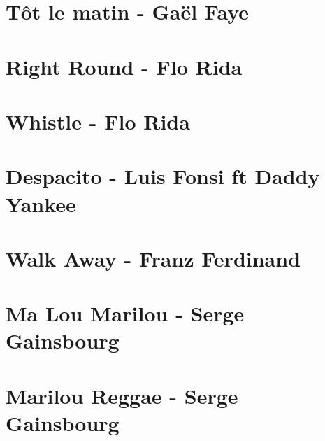 \documentclass{guitartabs}
\begin{document}
\section{Tôt le matin - Gaël Faye}
\begin{guitar}

\end{guitar}

\section{Right Round - Flo Rida}
\begin{guitar}

\end{guitar}


\section{Whistle - Flo Rida}
\begin{guitar}

\end{guitar}

\section{Despacito - Luis Fonsi ft Daddy Yankee}
\begin{guitar}

\end{guitar}



\section{Walk Away - Franz Ferdinand}
\begin{guitar}

\end{guitar}


\section{Ma Lou Marilou - Serge Gainsbourg}
\begin{guitar}

\end{guitar}

\section{Marilou Reggae - Serge Gainsbourg}
\begin{guitar}

\end{guitar}
\end{document}
